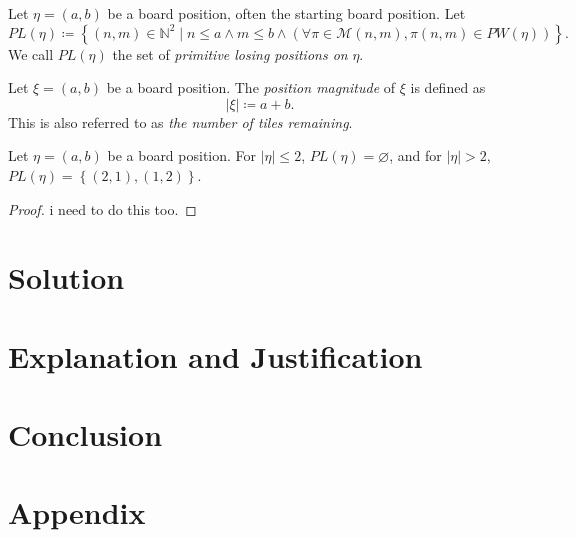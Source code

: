 \documentclass[11pt, letterpaper]{article}
\begin{document}
\begin{definition}\label{dfn:5}
	Let $\eta =(a,b)$ be a board position, often the starting board position. Let
	\[
		PL(\eta )\coloneqq \left\{ (n,m)\in\mathbb{N}^2 \mid n\leq a\land m\leq b\land (\forall \pi  \in\mathscr{M} (n,m), \pi (n,m)\in PW(\eta )) \right\} 
	.\]
	We call $PL(\eta )$ the set of \emph{primitive losing positions on} $\eta $.
\end{definition}
\begin{definition}\label{dfn:6}
	Let $\xi =(a,b)$ be a board position. The \emph{position magnitude} of $\xi $ is defined as
	\[
		\left| \xi  \right| \coloneqq a+b
	.\]
	This is also referred to as \emph{the number of tiles remaining}.
\end{definition}
\begin{theorem}\label{thm:2}
	Let $\eta =(a,b)$ be a board position. For $\left| \eta  \right| \leq 2$, $PL(\eta )=\varnothing$, and for $\left| \eta  \right| >2$, $PL(\eta )=\left\{ (2,1),(1,2) \right\} $.
\end{theorem}
\begin{proof}
	i need to do this too.
\end{proof}
\section{Solution}\label{sec:3}
\section{Explanation and Justification}\label{sec:4}
\section{Conclusion}\label{sec:5}
\appendix
\section{Appendix}\label{appendix}


\end{document}
